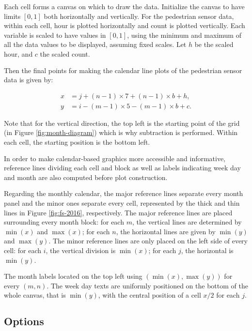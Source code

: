 \documentclass[12pt]{article}
\begin{document}
Each cell forms a canvas on which to draw the data. Initialize the
canvas to have limits \([0, 1]\) both horizontally and vertically. For
the pedestrian sensor data, within each cell, hour is plotted
horizontally and count is plotted vertically. Each variable is scaled to
have values in \([0,1]\), using the minimum and maximum of all the data
values to be displayed, assuming fixed scales. Let \(h\) be the scaled
hour, and \(c\) the scaled count.

Then the final points for making the calendar line plots of the
pedestrian sensor data is given by:

\begin{equation}
  \begin{aligned}
  x &= j + (n - 1) \times 7 + (n - 1) \times b + h, \\
  y &= i - (m - 1) \times 5 - (m - 1) \times b + c. \label{eq:final}
  \end{aligned}
\end{equation}

Note that for the vertical direction, the top left is the starting point
of the grid (in Figure \ref{fig:month-diagram}) which is why subtraction
is performed. Within each cell, the starting position is the bottom
left.

In order to make calendar-based graphics more accessible and
informative, reference lines dividing each cell and block as well as
labels indicating week day and month are also computed before plot
construction.

Regarding the monthly calendar, the major reference lines separate every
month panel and the minor ones separate every cell, represented by the
thick and thin lines in Figure \ref{fig:fs-2016}, respectively. The
major reference lines are placed surrounding every month block: for each
\(m\), the vertical lines are determined by \(\min{(x)}\) and
\(\max{(x)}\); for each \(n\), the horizontal lines are given by
\(\min{(y)}\) and \(\max{(y)}\). The minor reference lines are only
placed on the left side of every cell: for each \(i\), the vertical
division is \(\min{(x)}\); for each \(j\), the horizontal is
\(\min{(y)}\).

The month labels located on the top left using
\((\min{(x)}, \max{(y)})\) for every \((m, n)\). The week day texts are
uniformly positioned on the bottom of the whole canvas, that is
\(\min{(y)}\), with the central position of a cell \(x / 2\) for each
\(j\).

\hypertarget{options}{%
\subsection{Options}\label{options}}
\end{document}
